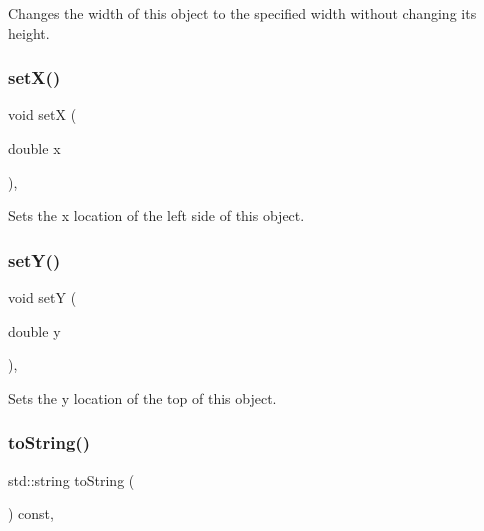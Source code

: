 Changes the width of this object to the specified width without changing its height. 

\mbox{\label{classGObject_a9c18fcc579333bf9653d13ad2b372e39}} 
\subsubsection{\texorpdfstring{set\+X()}{setX()}}
{\footnotesize\ttfamily void setX (\begin{DoxyParamCaption}\item[{double}]{x }\end{DoxyParamCaption})\hspace{0.3cm}{\ttfamily [virtual]}, {\ttfamily [inherited]}}



Sets the x location of the left side of this object. 

\mbox{\label{classGObject_a7d57e2a5c35d27feb58fd498a3cf82b9}} 
\subsubsection{\texorpdfstring{set\+Y()}{setY()}}
{\footnotesize\ttfamily void setY (\begin{DoxyParamCaption}\item[{double}]{y }\end{DoxyParamCaption})\hspace{0.3cm}{\ttfamily [virtual]}, {\ttfamily [inherited]}}



Sets the y location of the top of this object. 

\mbox{\label{classGObject_a1fe5121d6528fdea3f243321b3fa3a49}} 
\subsubsection{\texorpdfstring{to\+String()}{toString()}}
{\footnotesize\ttfamily std\+::string to\+String (\begin{DoxyParamCaption}{ }\end{DoxyParamCaption}) const\hspace{0.3cm}{\ttfamily [virtual]}, {\ttfamily [inherited]}}



